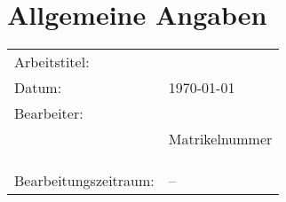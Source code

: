 \chapter{Allgemeine Angaben}
\label{chp:Allgemeine_Angaben}

\begin{tabular}{ll}
	Arbeitstitel: & \metadataTitle \\
	Datum: & \today \\
	Bearbeiter: & \metadataAuthor \\
	& Matrikelnummer \metadataMatriculationNumber \\
	& \metadataStreetNumber \\
	& \metadataPostalCodeTown \\
	& \metadataEmail \\
	Bearbeitungszeitraum: & \metadataBeginDate{} -- \metadataSubmitDate\\
\end{tabular}